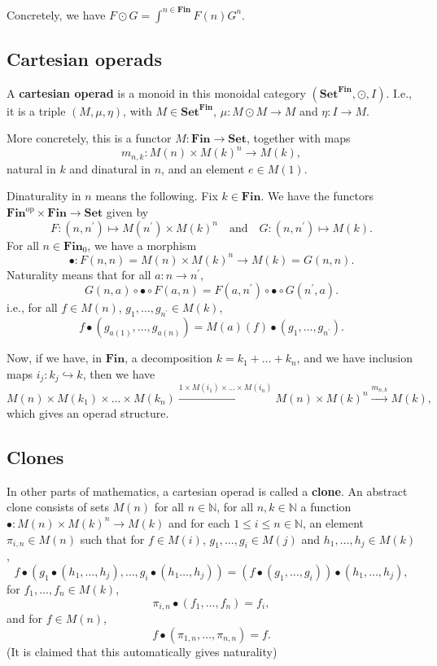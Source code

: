 \documentclass{amsbook}
\newcommand{\Catb}[1]{\mathbf{#1}}
\newcommand{\SET}{\Catb{Set}}
\newcommand{\FIN}{\Catb{Fin}}
\newcommand{\Ob}[1]{{#1}_0}
\newcommand{\op}[1]{\ensuremath{{#1}^\text{op}}}
\theoremstyle{definition}
\begin{document}
  Concretely, we have $ F \odot G = \int^{n \in \FIN} F(n) G^n $.

  \subsection{Cartesian operads}
  A \textbf{cartesian operad} is a monoid in this monoidal category $ (\SET^{\FIN}, \odot, I) $. I.e., it is a triple $ (M, \mu, \eta) $, with $ M \in \SET^\FIN $, $ \mu: M \odot M \to M $ and $ \eta: I \to M $.

  More concretely, this is a functor $ M : \FIN \to \SET $, together with maps
  \[ m_{n, k}: M(n) \times M(k)^n \to M(k), \]
  natural in $ k $ and dinatural in $ n $, and an element $ e \in M(1) $.

  Dinaturality in $ n $ means the following. Fix $ k \in \FIN $. We have the functors $ \op \FIN \times \FIN \to \SET $ given by
  \[ F: (n, n^\prime) \mapsto M(n^\prime) \times M(k)^{n} \quad \text{and} \quad G: (n, n^\prime) \mapsto M(k). \]
  For all $ n \in \Ob \FIN $, we have a morphism
  \[ \bullet: F(n, n) = M(n) \times M(k)^n \to M(k) = G(n, n). \]
  Naturality means that for all $ a: n \to n^\prime $,
  \[ G(n, a) \circ \bullet \circ F(a, n) = F(a, n^\prime) \circ \bullet \circ G(n^\prime, a). \]
  i.e., for all $ f \in M(n) $, $ g_1, \dots, g_{n^\prime} \in M(k) $,
  \[ f \bullet (g_{a(1)}, \dots, g_{a(n)}) = M(a)(f) \bullet (g_1, \dots, g_{n^\prime}). \]

  Now, if we have, in $ \FIN $, a decomposition $ k = k_1 + \dots + k_n $, and we have inclusion maps $ i_j: k_j \hookrightarrow k $, then we have
  \[ M(n) \times M(k_1) \times \dots \times M(k_n) \xrightarrow{1 \times M(i_1) \times \dots \times M(i_n)} M(n) \times M(k)^n \xrightarrow{m_{n, k}} M(k), \]
  which gives an operad structure.

  \subsection{Clones}
  In other parts of mathematics, a cartesian operad is called a \textbf{clone}. An abstract clone consists of sets $ M(n) $ for all $ n \in \mathbb N $, for all $ n, k \in \mathbb N $ a function $ \bullet: M(n) \times M(k)^n \to M(k) $ and for each $ 1 \leq i \leq n \in \mathbb N $, an element $ \pi_{i, n} \in M(n) $ such that for $ f \in M(i) $, $ g_1, \dots, g_i \in M(j) $ and $ h_1, \dots, h_j \in M(k) $,
  \[ f \bullet (g_1 \bullet (h_1, \dots, h_j), \dots, g_i \bullet (h_1 \dots, h_j)) = (f \bullet (g_1, \dots, g_i)) \bullet (h_1, \dots, h_j), \]
  for $ f_1, \dots, f_n \in M(k) $,
  \[ \pi_{i, n} \bullet (f_1, \dots, f_n) = f_i, \]
  and for $ f \in M(n) $,
  \[ f \bullet (\pi_{1, n}, \dots, \pi_{n, n}) = f. \]
  (It is claimed that this automatically gives naturality)
\end{document}
